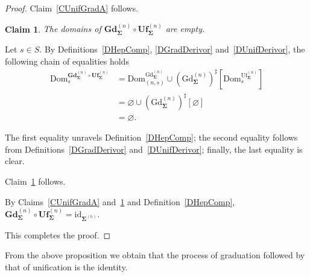 \documentclass[a4paper, reqno
]{amsart}
\newcommand{\sig}[1]{\mathbf{#1}}             %
\newcommand{\Dom}{\mathrm{Dom}}
\newcommand{\id}{\mathrm{id}}
\newcommand{\Gd}{\mathrm{Gd}}
\newcommand{\Uf}{\mathrm{Uf}}
\newcommand{\bGd}{\mathbf{Gd}}
\newcommand{\bUf}{\mathbf{Uf}}
\theoremstyle{plain}
\newtheorem{claim}[theorem]{Claim}
\theoremstyle{definition}
\begin{document}
\begin{proof}
Claim~\ref{CUnifGradA} follows.

\begin{claim}\label{CUnifGradB}
The domains of $\bGd^{(n)}_{\sig{\Sigma}}\circ\bUf^{(n)}_{\sig{\Sigma}}$ are empty.
\end{claim}

Let $s\in S$.
By Definitions~\ref{DHepComp}, \ref{DGradDerivor} and~\ref{DUnifDerivor}, the following chain of equalities holds
\begin{align*}
\Dom^{\bGd^{(n)}_{\sig{\Sigma}}\circ\bUf^{(n)}_{\sig{\Sigma}}}_{s}
&=
\Dom^{\Gd^{(n)}_{\sig{\Sigma}}}_{(n,s)}\cup\left(\Gd^{(n)}_{\sig{\Sigma}}\right)^{\sharp}\left[\Dom^{\Uf^{(n)}_{\sig{\Sigma}}}_{s}\right]
\tag{1}
\\&=
\varnothing\cup\left(\Gd^{(n)}_{\sig{\Sigma}}\right)^{\sharp}[\varnothing]
\tag{2}
\\&=
\varnothing.
\tag{3}
\end{align*}

The first equality unravels Definition~\ref{DHepComp}; the second equality follows from Definitions~\ref{DGradDerivor} and~\ref{DUnifDerivor}; finally, the last equality is clear.

Claim~\ref{CUnifGradB} follows.

By Claims~\ref{CUnifGradA} and~\ref{CUnifGradB} and Definition~\ref{DHepComp}, $\bGd^{(n)}_{\sig{\Sigma}}\circ\bUf^{(n)}_{\sig{\Sigma}}=\id_{\sig{\Sigma}^{(n)}}$.

This completes the proof.
\end{proof}

From the above proposition we obtain that the process of graduation followed by that of unification is the identity.
\end{document}
